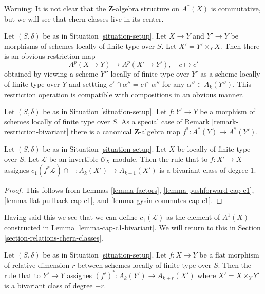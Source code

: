 \noindent
Warning: It is not clear that the $\mathbf{Z}$-algebra structure
on $A^*(X)$ is commutative, but we will see that chern classes live
in its center.

\begin{remark}
\label{remark-restriction-bivariant}
Let $(S, \delta)$ be as in Situation \ref{situation-setup}. Let $X \to Y$
and $Y' \to Y$ be morphisms of schemes locally of finite type over $S$.
Let $X' = Y' \times_Y X$. Then there is an obvious restriction map
$$
A^p(X \to Y) \longrightarrow A^p(X' \to Y'),\quad
c \longmapsto c'
$$
obtained by viewing a scheme $Y''$ locally of finite type over $Y'$
as a scheme locally of finite type over $Y$ and settting
$c' \cap \alpha'' = c \cap \alpha''$ for any $\alpha'' \in A_k(Y'')$.
This restriction operation is compatible with compositions in an
obvious manner.
\end{remark}

\begin{remark}
\label{remark-pullback-cohomology}
Let $(S, \delta)$ be as in Situation \ref{situation-setup}.
Let $f : Y' \to Y$ be a morphism of schemes locally of finite type over $S$.
As a special case of Remark \ref{remark-restriction-bivariant}
there is a canonical $\mathbf{Z}$-algebra map $f^* : A^*(Y) \to A^*(Y')$.
\end{remark}

\begin{lemma}
\label{lemma-cap-c1-bivariant}
Let $(S, \delta)$ be as in Situation \ref{situation-setup}.
Let $X$ be locally of finite type over $S$.
Let $\mathcal{L}$ be an invertible $\mathcal{O}_X$-module.
Then the rule that to $f : X' \to X$ assignes
$c_1(f^*\mathcal{L}) \cap - : A_k(X') \to A_{k - 1}(X')$
is a bivariant class of degree $1$.
\end{lemma}

\begin{proof}
This follows from Lemmas \ref{lemma-factors},
\ref{lemma-pushforward-cap-c1},
\ref{lemma-flat-pullback-cap-c1}, and
\ref{lemma-gysin-commutes-cap-c1}.
\end{proof}

\noindent
Having said this we see that we can define $c_1(\mathcal{L})$ as the element
of $A^1(X)$ constructed in Lemma \ref{lemma-cap-c1-bivariant}.
We will return to this in Section \ref{section-relations-chern-classes}.

\begin{lemma}
\label{lemma-flat-pullback-bivariant}
Let $(S, \delta)$ be as in Situation \ref{situation-setup}.
Let $f : X \to Y$ be a flat morphism of relative dimension $r$
between schemes locally of finite type over $S$.
Then the rule that to $Y' \to Y$ assignes
$(f')^* : A_k(Y') \to A_{k + r}(X')$ where $X' = X \times_Y Y'$
is a bivariant class of degree $-r$.
\end{lemma}

